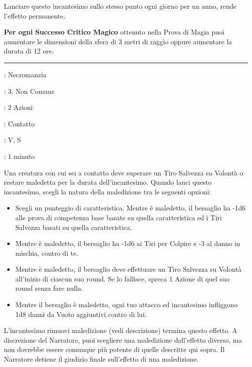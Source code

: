 \begin{multicols}{2}
Lanciare questo incantesimo sullo stesso punto ogni giorno per un anno, rende l'effetto permanente.

\textbf{Per ogni Successo Critico Magico} ottenuto nella Prova di Magia puoi aumentare le dimensioni della sfera di 3 metri di raggio oppure aumentare la durata di 12 ore.

\smallskip\noindent\rule{\linewidth}{2pt} \hypertarget{Scagliare Maledizione}{}\medskip{}
\noindent
\begin{description}[noitemsep, topsep=0pt, parsep=0pt, partopsep=0pt, leftmargin=0cm, labelwidth=2.8cm]
	\item[\textbf{Lista di Magia}]: Necromanzia
	\item[\textbf{Livello}]: 3, Non Comune
	\item[\textbf{T. di Lancio}]: 2 Azioni
	\item[\textbf{Gittata}]: Contatto
	\item[\textbf{Componenti}]: V, S
	\item[\textbf{Durata}]: 1 minuto
\end{description}

Una creatura con cui sei a contatto deve superare un Tiro Salvezza su Volontà o restare maledetta per la durata dell'incantesimo. Quando lanci questo incantesimo, scegli la natura della maledizione tra le seguenti opzioni:

\begin{itemize}[leftmargin=*] \setlength{\itemsep}{0pt}
	\item Scegli un punteggio di caratteristica. Mentre è maledetto, il bersaglio ha -1d6 alle prova di competenza base basate su quella caratteristica ed i Tiri Salvezza basati su quella caratteristica.
	\item Mentre è maledetto, il bersaglio ha -1d6 ai Tiri per Colpire e -3 al danno in mischia, contro di te.
	\item Mentre è maledetto, il bersaglio deve effettuare un Tiro Salvezza su Volontà all'inizio di ciascun suo round. Se lo fallisce, spreca 1 Azione di quel suo round senza fare nulla.
	\item Mentre il bersaglio è maledetto, ogni tuo attacco ed incantesimo infliggono 1d8 danni da Vuoto aggiuntivi contro di lui.
\end{itemize}

L'incantesimo rimuovi maledizione (vedi descrizione) termina questo effetto. A discrezione del Narratore, puoi scegliere una maledizione dall'effetto diverso, ma non dovrebbe essere comunque più potente di quelle descritte qui sopra. Il Narratore detiene il giudizio finale sull'effetto di una maledizione.


\end{multicols}
